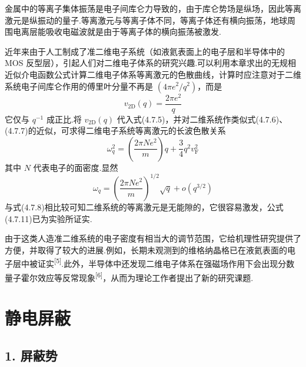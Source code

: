 金属中的等离子集体振荡是电子间库仑力导致的，由于库仑势场是纵场，因此等离激元是纵振动的量子.等离激元与等离子体不同，等离子体还有横向振荡，地球周围电离层能吸收电磁波就是由于等离子体的横向振荡被激发.

近年来由于人工制成了准二维电子系统（如液氦表面上的电子层和半导体中的 MOS 反型层），引起人们对二维电子体系的研究兴趣.可以利用本章求出的无规相近似介电函数公式计算二维电子体系等离激元的色散曲线，计算时应注意对于二维系统电子间库仑作用的傅里叶分量不再是 $\left(4\pi e^{2}/q^{2}\right)$，而是
\begin{equation}
  v_{\mathrm{2D}}(q)=\frac{2\pi e^{2}}{q}
\end{equation}
它仅与 $q^{-1}$ 成正比.将 $v_{\mathrm{2D}}(q)$ 代入式(4.7.5)，并对二维系统作类似式(4.7.6)、(4.7.7)的近似，可求得二维电子系统等离激元的长波色散关系
\begin{equation}
  \omega_{q}^{2}=\left(\frac{2\pi Ne^{2}}{m}\right)q+\frac{3}{4}q^{2}v_{\mathrm{F}}^{2}
\end{equation}
其中 $N$ 代表电子的面密度.显然
\begin{equation}
  \omega_{q}=\left(\frac{2\pi Ne^{2}}{m}\right)^{1/2}\sqrt{q}
  +o\left(q^{3/2}\right)
\end{equation}
与式(4.7.8)相比较可知二维系统的等离激元是无能隙的，它很容易激发，公式(4.7.11)已为实验所证实.

由于这类人造准二维系统的电子密度有相当大的调节范围，它给机理性研究提供了方便，并取得了较大的进展.例如，长期未观测到的维格纳晶格已在液氦表面的电子层中被证实\textsuperscript{[5]}.此外，半导体中还发现二维电子体系在强磁场作用下会出现分数量子霍尔效应等反常现象\textsuperscript{[6]}，从而为理论工作者提出了新的研究课题.

\section{静电屏蔽}

\subsection*{1. 屏蔽势}

